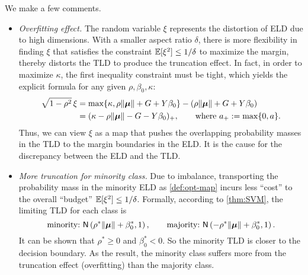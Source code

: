 We make a few comments.
\begin{itemize}
\item \textit{Overfitting effect.} The random variable $\xi$ represents the distortion of ELD due to high dimensions. With a smaller aspect ratio $\delta$, there is more flexibility in finding $\xi$ that satisfies the constraint $\mathbb{E}[\xi^2] \le 1/\delta$ to maximize the margin, 
thereby distorts the TLD to produce the truncation effect.
In fact, in order to maximize $\kappa$, the first inequality constraint must be tight, which yields the explicit formula for any given $\rho, \beta_0, \kappa$:
\begin{align}
\sqrt{1 - \rho^2} \, \xi  & = \max \{ \kappa, \rho \| {\boldsymbol{\mu}}\| + G + Y \beta_0 \} - ( \rho \| {\boldsymbol{\mu}}\| + G + Y \beta_0 ) \notag \\
&= (\kappa - \rho \| {\boldsymbol{\mu}}\| - G - Y \beta_0)_+, \qquad \text{where}~a_+ := \max\{0,a\}. \label{def:opt-map}
\end{align}
Thus, we can view $\xi$ as a map that pushes the overlapping probability masses in the TLD to the margin boundaries in the ELD. It is the cause for the discrepancy between the ELD and the TLD.

\item \textit{More truncation for minority class.} Due to imbalance, transporting the probability mass in the minority ELD as \cref{def:opt-map} incurs less ``cost'' to the overall ``budget'' $\mathbb{E}[\xi^2] \le 1/\delta$.
Formally, according to \cref{thm:SVM}, the limiting TLD for each class is
\begin{equation*}
    \text{minority:}~ {\sf N} \left( \rho^* \|{\boldsymbol{\mu}}\| + \beta_0^*, 1\right),
    \qquad
    \text{majority:}~ {\sf N} \left( -\rho^* \|{\boldsymbol{\mu}}\| + \beta_0^*, 1\right).
\end{equation*}
It can be shown that $\rho^* \ge 0$ and $\beta_0^* < 0$. So the minority TLD is closer to the decision boundary.
As the result, the minority class suffers more from the truncation effect (overfitting) than the majority class.



\end{itemize}
